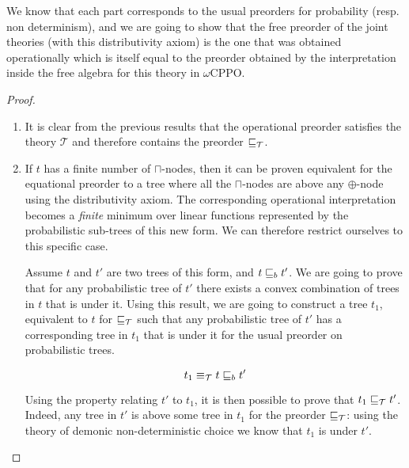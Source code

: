 We know that each part corresponds to the usual 
preorders for probability (resp. non determinism), 
and we are going to show that the 
free preorder of the joint theories (with this 
distributivity axiom) is the one that was obtained 
operationally which is itself equal to the preorder 
obtained by the interpretation inside the free 
algebra for this theory in $\omega$CPPO.

\begin{proof}
    \begin{enumerate}
        \item It is clear from the previous results that the operational preorder 
            satisfies the theory $\mathcal{T}$ and therefore contains 
            the preorder $\sqsubseteq_\mathcal{T}$.

        \item 
            If $t$ has a finite number of $\sqcap$-nodes, then 
            it can be proven equivalent for the equational preorder 
            to a tree where all the $\sqcap$-nodes are above any $\oplus$-node
            using the distributivity axiom.
            The corresponding operational interpretation becomes a \emph{finite}
            minimum over linear functions represented by the probabilistic
            sub-trees of this new form. We can therefore restrict ourselves 
            to this specific case.

            Assume $t$ and $t'$ are two trees of this form, and $t \sqsubseteq_b t'$.
            We are going to prove that for any probabilistic tree of $t'$ there exists 
            a convex combination of trees in $t$ that is under it. Using this 
            result, we are going to construct a tree $t_1$, equivalent to $t$ 
            for $\sqsubseteq_\mathcal{T}$ such that any probabilistic tree of $t'$ 
            has a corresponding tree in $t_1$ that is under it for the usual 
            preorder on probabilistic trees.

            \begin{equation*}
                t_1 \equiv_\mathcal{T} t \sqsubseteq_b t'
            \end{equation*}

            Using the property relating $t'$ to $t_1$, it is then possible 
            to prove that $t_1 \sqsubseteq_\mathcal{T} t'$. Indeed, any tree in 
            $t'$ is above some tree in $t_1$ for the preorder
            $\sqsubseteq_\mathcal{T}$: using the theory of demonic non-deterministic
            choice we know that $t_1$ is under $t'$.


\end{enumerate}
\end{proof}

